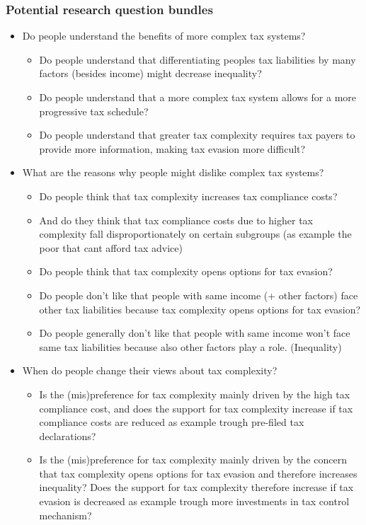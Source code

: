 \documentclass[a4paper, 12pt]{article}
\begin{document}
\subsubsection{Potential research question bundles}
\begin{itemize}
    \item Do people understand the benefits of more complex tax systems?
    \begin{itemize}
        \item Do people understand that differentiating peoples tax liabilities by many factors (besides income) might decrease inequality?
        \item Do people understand that a more complex tax system allows for a more progressive tax schedule?
        \item Do people understand that greater tax complexity requires tax payers to provide more information, making tax evasion more difficult? 
    \end{itemize}
    \item What are the reasons why people might dislike complex tax systems? 
    \begin{itemize}
        \item Do people think that tax complexity increases tax compliance costs? 
        \item And do they think that tax compliance costs due to higher tax complexity fall disproportionately on certain subgroups (as example the poor that cant afford tax advice)
        \item Do people think that tax complexity opens options for tax evasion?
        \item Do people don't like that people with same income (+ other factors) face other tax liabilities because tax complexity opens options for tax evasion?
        \item Do people generally don't like that people with same income won't face same tax liabilities because also other factors play a role. (Inequality)
    \end{itemize}
    \item When do people change their views about tax complexity? 
    \begin{itemize}
        \item Is the (mis)preference for tax complexity mainly driven by the high tax compliance cost, and does the support for tax complexity increase if tax compliance costs are reduced as example trough pre-filed tax declarations? 
        \item Is the (mis)preference for tax complexity mainly driven by the concern that tax complexity opens options for tax evasion and therefore increases inequality? Does the support for tax complexity therefore increase if tax evasion is decreased as example trough more investments in tax control mechanism?
    \end{itemize}
\end{itemize}
\end{document}
